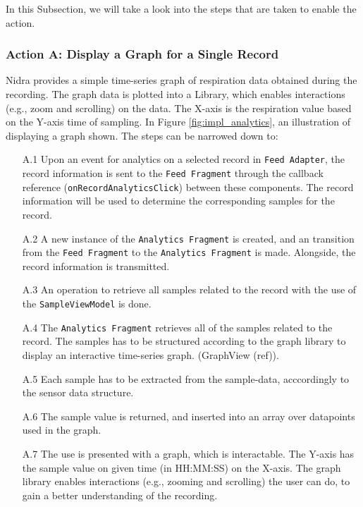 In this Subsection, we will take a look into the steps that are taken to enable the action.

\subsubsection{Action A: Display a Graph for a Single Record}
Nidra provides a simple time-series graph of respiration data obtained during the recording. The graph data is plotted into a Library, which enables interactions (e.g., zoom and scrolling) on the data. The X-axis is the respiration value based on the Y-axis time of sampling. In Figure \ref{fig:impl_analytics}, an illustration of displaying a graph shown. The steps can be narrowed down to:

\begin{itemize}
    \item[A.1] Upon an event for analytics on a selected record in \verb|Feed Adapter|, the record information is sent to the \verb|Feed Fragment| through the callback reference (\verb|onRecordAnalyticsClick|) between these components. The record information will be used to determine the corresponding samples for the record.
    \item[A.2] A new instance of the \verb|Analytics Fragment| is created, and an transition from the \verb|Feed Fragment| to the \verb|Analytics Fragment| is made. Alongside, the record information is transmitted.
    \item[A.3] An operation to retrieve all samples related to the record with the use of the \verb|SampleViewModel| is done. 
    \item[A.4] The \verb|Analytics Fragment| retrieves all of the samples related to the record. The samples has to be structured according to the graph library to display an interactive time-series graph. (GraphView (ref)).
    \item[A.5] Each sample has to be extracted from the sample-data, acccordingly to the sensor data structure.
    \item[A.6] The sample value is returned, and inserted into an array over datapoints used in the graph. 
    \item[A.7] The use is presented with a graph, which is interactable. The Y-axis has the sample value on given time (in HH:MM:SS) on the X-axis. The graph library enables interactions (e.g., zooming and scrolling) the user can do, to gain a better understanding of the recording. 
\end{itemize}



